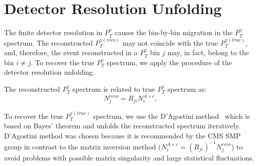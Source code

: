 \section{Detector Resolution Unfolding}
\label{sec:Unfolding}



The finite detector resolution in $P_T^\gamma$ causes the bin-by-bin migration in the $P_T^{\gamma}$ spectrum. The reconstructed $P_T^{\gamma(reco)}$ may not coincide with the true $P_T^{\gamma(true)}$, and, therefore, the event reconstructed in a $P_T^{\gamma}$ bin $j$ may, in fact, belong to the bin $i \neq j$. To recover the true $P_T^{\gamma}$ spectrum, we apply the procedure of the detector resolution unfolding.

The reconstructed $P_T^{\gamma}$ spectrum is related to true $P_T^{\gamma}$ spectrum as:
\begin{equation}
  N^{reco}_{j} = R_{ji} N^{A\times\epsilon}_{i},
\end{equation}

To recover the true $P_T^{\gamma(true)}$ spectrum, we use the D'Agostini method~\cite{ref_DAgostini} which is based on Bayes' theorem and unfolds the reconstructed spectrum iteratively. D'Agostini method was chosen because it is recommended by the CMS SMP group in contrast to the matrix inversion method ($N^{A\times\epsilon}_{i} = \left( R_{ji} \right) ^{-1} N^{reco}_{j}$) to avoid problems with possible matrix singularity and large statistical fluctuations.

